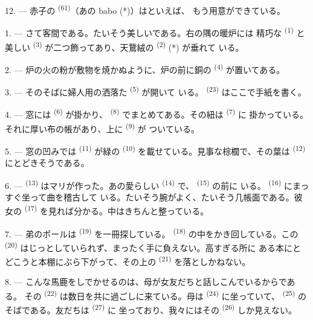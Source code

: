 12. --- 赤子の \textsuperscript{(61)}（あの babo (*)）はといえば、
もう用意ができている。

\VUsaut{5.0mm}
\VUsaut{3.0mm}

1. --- さて客間である。たいそう美しいである。右の隅の暖炉には
精巧な \textsuperscript{(1)} と美しい \textsuperscript{(3)}
が二つ飾ってあり、天鵞絨の \textsuperscript{(2)} (*) が垂れて
いる。

2. --- 炉の火の粉が敷物を焼かぬように、炉の前に銅の
\textsuperscript{(4)} が置いてある。

3. --- そのそばに婦人用の洒落た \textsuperscript{(5)} が開いて
いる。 \textsuperscript{(23)} はここで手紙を書く。

4. --- 窓には \textsuperscript{(6)} が掛かり、
\textsuperscript{(8)} でまとめてある。その紐は \textsuperscript{(7)} に
掛かっている。それに厚い布の帳があり、上に \textsuperscript{(9)} が
ついている。

5. --- 窓の凹みでは \textsuperscript{(11)} が緑の
\textsuperscript{(10)} を載せている。見事な棕櫚で、その葉は
\textsuperscript{(12)} にとどきそうである。

6. ---  \textsuperscript{(13)} はマリが作った。あの愛らしい
 \textsuperscript{(14)} で、 \textsuperscript{(15)} の前に
いる。 \textsuperscript{(16)} にまっすぐ坐って曲を稽古して
いる。たいそう腕がよく、たいそう几帳面である。彼女の
\textsuperscript{(17)} を見れば分かる。中はきちんと整っている。

\VUsaut{5.0mm}
\VUsaut{3.0mm}

7. --- 弟のポールは \textsuperscript{(19)} を一冊探している。
 \textsuperscript{(18)} の中をかき回している。この
\textsuperscript{(20)} はじっとしていられず、まったく手に負えない。高すぎる所に
ある本にとどこうと本棚にぶら下がって、その上の \textsuperscript{(21)}
を落としかねない。

8. --- こんな馬鹿をしでかせるのは、母が女友だちと話しこんでいるからである。
その \textsuperscript{(22)} は数日を共に過ごしに来ている。母は
 \textsuperscript{(24)} に坐っていて、
\textsuperscript{(25)} のそばである。友だちは \textsuperscript{(27)} に
坐っており、我々にはその \textsuperscript{(26)} しか見えない。


